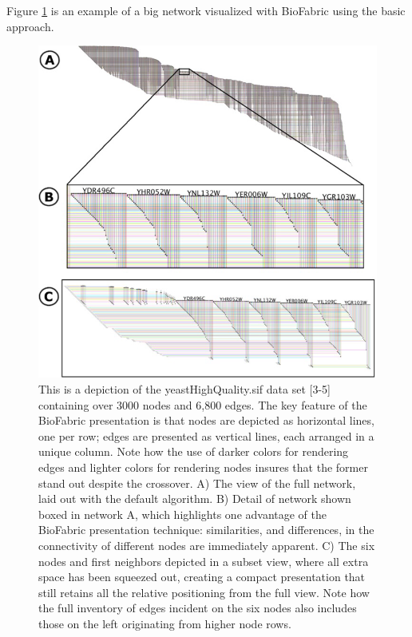 \documentclass[a4paper,11pt]{kth-mag}
\begin{document}
Figure \ref{fig:bio_default} is an example of a big network visualized with BioFabric using the basic approach.

\begin{figure}[!htbp]
	\centering
	\includegraphics[scale=0.7]{BIODefault}
	\caption{This is a depiction of the yeastHighQuality.sif data set [3-5] containing over 3000 nodes and 6,800 edges.
The key feature of the BioFabric presentation is that nodes are depicted as horizontal lines, one per row; edges are presented as vertical lines,
each arranged in a unique column. Note how the use of darker colors for rendering edges and lighter colors for rendering nodes insures that the
former stand out despite the crossover. A) The view of the full network, laid out with the default algorithm. B) Detail of network shown boxed in
network A, which highlights one advantage of the BioFabric presentation technique: similarities, and differences, in the connectivity of different
nodes are immediately apparent. C) The six nodes and first neighbors depicted in a subset view, where all extra space has been squeezed out,
creating a compact presentation that still retains all the relative positioning from the full view. Note how the full inventory of edges incident on
the six nodes also includes those on the left originating from higher node rows.}
	\label{fig:bio_default}
\end{figure}
\end{document}
